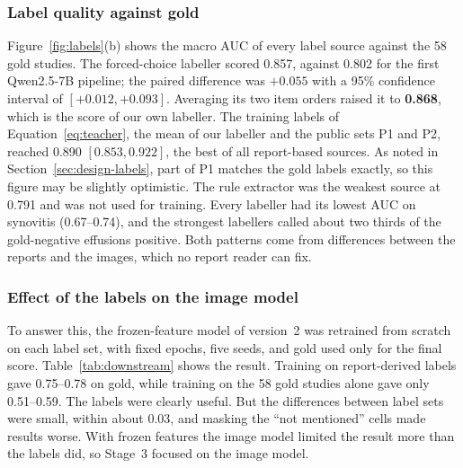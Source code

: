 \subsubsection{Label quality against gold} Figure~\ref{fig:labels}(b) shows the macro AUC of every label source against the 58 gold studies. The forced-choice labeller scored 0.857, against 0.802 for the first Qwen2.5-7B pipeline; the paired difference was $+0.055$ with a 95\% confidence interval of $[+0.012, +0.093]$. Averaging its two item orders raised it to \textbf{0.868}, which is the score of our own labeller. The training labels of Equation~\eqref{eq:teacher}, the mean of our labeller and the public sets P1 and P2, reached 0.890 $[0.853, 0.922]$, the best of all report-based sources. As noted in Section~\ref{sec:design-labels}, part of P1 matches the gold labels exactly, so this figure may be slightly optimistic. The rule extractor was the weakest source at 0.791 and was not used for training. Every labeller had its lowest AUC on synovitis (0.67--0.74), and the strongest labellers called about two thirds of the gold-negative effusions positive. Both patterns come from differences between the reports and the images, which no report reader can fix.

\subsubsection{Effect of the labels on the image model} To answer this, the frozen-feature model of version~2 was retrained from scratch on each label set, with fixed epochs, five seeds, and gold used only for the final score. Table~\ref{tab:downstream} shows the result. Training on report-derived labels gave 0.75--0.78 on gold, while training on the 58 gold studies alone gave only 0.51--0.59. The labels were clearly useful. But the differences between label sets were small, within about 0.03, and masking the ``not mentioned'' cells made results worse. With frozen features the image model limited the result more than the labels did, so Stage~3 focused on the image model.

